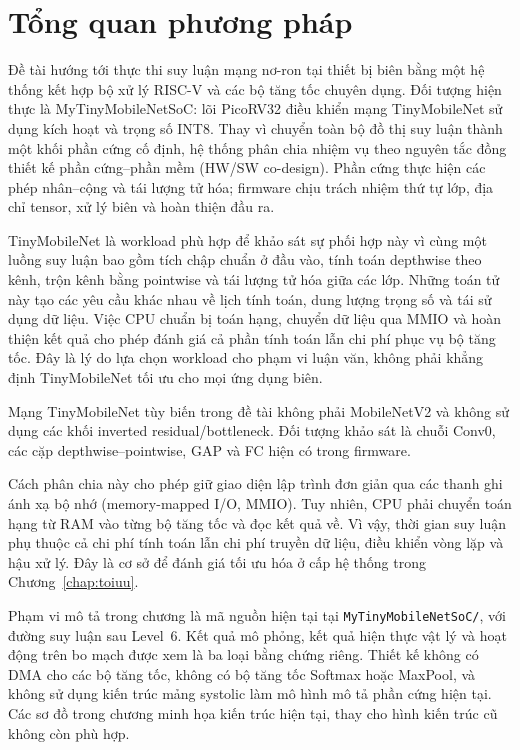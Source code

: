 \section{Tổng quan phương pháp}
Đề tài hướng tới thực thi suy luận mạng nơ-ron tại thiết bị biên bằng một hệ thống kết hợp bộ xử lý RISC-V và các bộ tăng tốc chuyên dụng. Đối tượng hiện thực là MyTinyMobileNetSoC: lõi PicoRV32 điều khiển mạng TinyMobileNet sử dụng kích hoạt và trọng số INT8. Thay vì chuyển toàn bộ đồ thị suy luận thành một khối phần cứng cố định, hệ thống phân chia nhiệm vụ theo nguyên tắc đồng thiết kế phần cứng--phần mềm (HW/SW co-design). Phần cứng thực hiện các phép nhân--cộng và tái lượng tử hóa; firmware chịu trách nhiệm thứ tự lớp, địa chỉ tensor, xử lý biên và hoàn thiện đầu ra.

TinyMobileNet là workload phù hợp để khảo sát sự phối hợp này vì cùng một luồng suy luận bao gồm tích chập chuẩn ở đầu vào, tính toán depthwise theo kênh, trộn kênh bằng pointwise và tái lượng tử hóa giữa các lớp. Những toán tử này tạo các yêu cầu khác nhau về lịch tính toán, dung lượng trọng số và tái sử dụng dữ liệu. Việc CPU chuẩn bị toán hạng, chuyển dữ liệu qua MMIO và hoàn thiện kết quả cho phép đánh giá cả phần tính toán lẫn chi phí phục vụ bộ tăng tốc. Đây là lý do lựa chọn workload cho phạm vi luận văn, không phải khẳng định TinyMobileNet tối ưu cho mọi ứng dụng biên.

Mạng TinyMobileNet tùy biến trong đề tài không phải MobileNetV2 và không sử dụng các khối inverted residual/bottleneck. Đối tượng khảo sát là chuỗi Conv0, các cặp depthwise--pointwise, GAP và FC hiện có trong firmware.

Cách phân chia này cho phép giữ giao diện lập trình đơn giản qua các thanh ghi ánh xạ bộ nhớ (memory-mapped I/O, MMIO). Tuy nhiên, CPU phải chuyển toán hạng từ RAM vào từng bộ tăng tốc và đọc kết quả về. Vì vậy, thời gian suy luận phụ thuộc cả chi phí tính toán lẫn chi phí truyền dữ liệu, điều khiển vòng lặp và hậu xử lý. Đây là cơ sở để đánh giá tối ưu hóa ở cấp hệ thống trong Chương~\ref{chap:toiuu}.

Phạm vi mô tả trong chương là mã nguồn hiện tại tại \texttt{MyTinyMobileNetSoC/}, với đường suy luận sau Level~6. Kết quả mô phỏng, kết quả hiện thực vật lý và hoạt động trên bo mạch được xem là ba loại bằng chứng riêng. Thiết kế không có DMA cho các bộ tăng tốc, không có bộ tăng tốc Softmax hoặc MaxPool, và không sử dụng kiến trúc mảng systolic làm mô hình mô tả phần cứng hiện tại. Các sơ đồ trong chương minh họa kiến trúc hiện tại, thay cho hình kiến trúc cũ không còn phù hợp.

